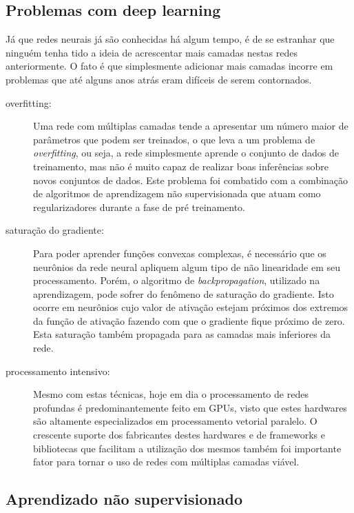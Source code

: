 \subsection{Problemas com deep learning}

Já que redes neurais já são conhecidas há algum tempo, é de se estranhar que
ninguém tenha tido a ideia de acrescentar mais camadas nestas redes
anteriormente. O fato é que simplesmente adicionar mais camadas incorre em
problemas que até alguns anos atrás eram difíceis de serem contornados.

\begin{description}

  \item[overfitting:] Uma rede com múltiplas camadas tende a apresentar um
    número maior de parâmetros que podem ser treinados, o que leva a um
    problema de \emph{overfitting}, ou seja, a rede simplesmente aprende o
    conjunto de dados de treinamento, mas não é muito capaz de realizar boas
    inferências sobre novos conjuntos de dados. Este problema foi combatido com
    a combinação de algoritmos de aprendizagem não supervisionada que atuam
    como regularizadores durante a fase de pré treinamento.

  \item[saturação do gradiente:] Para poder aprender funções convexas
    complexas, é necessário que os neurônios da rede neural apliquem algum tipo
    de não linearidade em seu processamento. Porém, o algoritmo de
    \emph{backpropagation}, utilizado na aprendizagem, pode sofrer do fenômeno
    de saturação do gradiente. Isto ocorre em neurônios cujo valor de ativação
    estejam próximos dos extremos da função de ativação fazendo com que o
    gradiente fique próximo de zero. Esta saturação também propagada para as
    camadas mais inferiores da rede.

  \item[processamento intensivo:] Mesmo com estas técnicas, hoje em dia o
    processamento de redes profundas é predominantemente feito em GPUs, visto
    que estes hardwares são altamente especializados em processamento vetorial
    paralelo. O crescente suporte dos fabricantes destes hardwares e de
    frameworks e bibliotecas que facilitam a utilização dos mesmos também foi
    importante fator para tornar o uso de redes com múltiplas camadas viável.

\end{description}

\subsection{Aprendizado não supervisionado}

